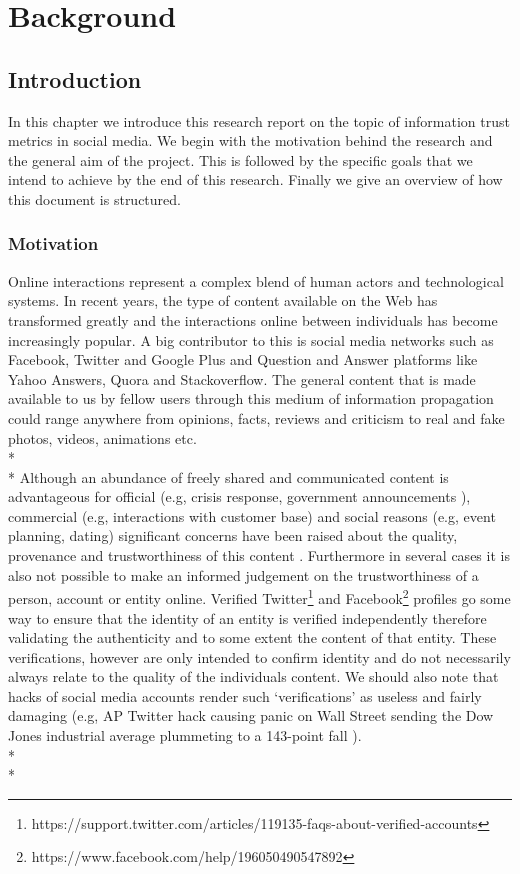 \part{Background}
\chapter{Introduction}
In this chapter we introduce this research report on the topic of information trust metrics in social media. We begin with the motivation behind the research and the general aim of the project. This is followed by the specific goals that we intend to achieve by the end of this research. Finally we give an overview of how this document is structured. 
\section{Motivation}
Online interactions represent a complex blend of human actors and technological systems\cite{2}. In recent years, the type of content available on the Web has transformed greatly and the interactions online between individuals has become increasingly popular\cite{5}. A big contributor to this is social media networks such as Facebook, Twitter and Google Plus and Question and Answer platforms like Yahoo Answers, Quora and Stackoverflow. The general content that is made available to us by fellow users through this medium of information propagation could range anywhere from opinions, facts, reviews and criticism to real and fake photos, videos, animations etc.\\*\\*
Although an abundance of freely shared and communicated content is advantageous for official (e.g, crisis response\cite{25}, government announcements \cite{26}), commercial (e.g, interactions with customer base) and social reasons (e.g, event planning, dating) significant concerns have been raised about the quality, provenance and trustworthiness of this content \cite{13,27,28}. Furthermore in several cases it is also not possible to make an informed judgement on the trustworthiness of a person, account or entity online. Verified Twitter\footnote{https://support.twitter.com/articles/119135-faqs-about-verified-accounts} and Facebook\footnote{https://www.facebook.com/help/196050490547892} profiles go some way to ensure that the identity of an entity is verified independently therefore validating the authenticity and to some extent the content of that entity. These verifications, however are only intended to confirm identity and do not necessarily always relate to the quality of the individuals content. We should also note that hacks of social media accounts render such `verifications' as useless and fairly damaging (e.g, AP Twitter hack causing panic on Wall Street sending the Dow Jones industrial average plummeting to a 143-point fall \cite{16}).\\*\\*
